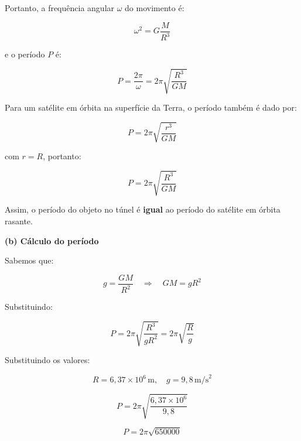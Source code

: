 \documentclass[a4paper,12pt]{article}
\begin{document}
\begin{flushleft}
Portanto, a frequência angular \( \omega \) do movimento é:

\begin{equation}
\omega^2 = G \frac{M}{R^3}
\end{equation}

e o período \( P \) é:

\begin{equation}
P = \frac{2\pi}{\omega} = 2\pi \sqrt{\frac{R^3}{G M}}
\end{equation}

\vspace{0.5cm}

Para um satélite em órbita na superfície da Terra, o período também é dado por:

\begin{equation}
P = 2\pi \sqrt{\frac{r^3}{G M}}
\end{equation}

com \( r = R \), portanto:

\begin{equation}
P = 2\pi \sqrt{\frac{R^3}{G M}}
\end{equation}

Assim, o período do objeto no túnel é \textbf{igual} ao período do satélite em órbita rasante.

\vspace{0.5cm}

\textbf{(b) Cálculo do período}

Sabemos que:

\begin{equation}
g = \frac{G M}{R^2}
\quad \Rightarrow \quad G M = g R^2
\end{equation}

Substituindo:

\begin{equation}
P = 2\pi \sqrt{ \frac{R^3}{g R^2} } = 2\pi \sqrt{ \frac{R}{g} }
\end{equation}

Substituindo os valores:

\begin{equation}
R = 6{,}37 \times 10^6 \, \text{m}, \quad g = 9{,}8 \, \text{m/s}^2
\end{equation}

\begin{equation}
P = 2\pi \sqrt{ \frac{6{,}37 \times 10^6}{9{,}8} }
\end{equation}

\begin{equation}
P = 2\pi \sqrt{650000}
\end{equation}


\end{flushleft}
\end{document}
